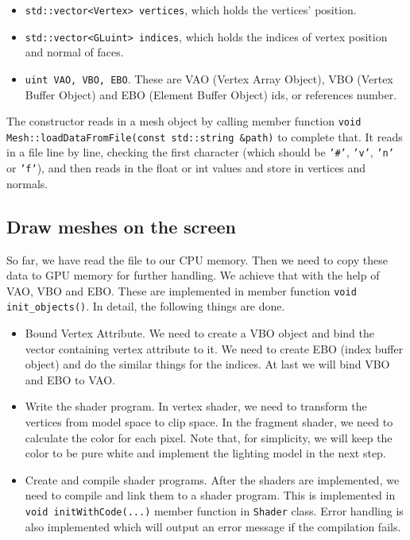 \documentclass[acmtog]{acmart}
\begin{document}
\begin{itemize}
	\item \texttt{std::vector<Vertex> vertices}, which holds the vertices' position.
 	\item \texttt{std::vector<GLuint> indices}, which holds the indices of vertex position and normal of faces.
  	\item \texttt{uint VAO, VBO, EBO}. These are VAO (Vertex Array Object), VBO (Vertex Buffer Object) and EBO (Element Buffer Object) ids, or references number.
\end{itemize}

The constructor reads in a mesh object by calling member function \texttt{void Mesh::loadDataFromFile(const std::string \&path)} to complete that. It reads in a file line by line, checking the first character (which should be \texttt{'\#'}, \texttt{'v'}, \texttt{'n'} or \texttt{'f'}), and then reads in the float or int values and store in vertices and normals.


\subsection{Draw meshes on the screen}

So far, we have read the file to our CPU memory. Then we need to copy these data to GPU memory for further handling. We achieve that with the help of VAO, VBO and EBO. These are implemented in member function \texttt{void init\_objects()}. In detail, the following things are done.

\begin{itemize}
	\item Bound Vertex Attribute. We need to create a VBO object and bind the vector containing vertex attribute to it. We need to create EBO (index buffer object) and do the similar things for the indices. At last we will bind VBO and EBO to VAO.
	\item Write the shader program. In vertex shader, we need to transform the vertices from model space to clip space. In the fragment shader, we need to calculate the color for each pixel. Note that, for simplicity, we will keep the color to be pure white and implement the lighting model in the next step.
	\item Create and compile shader programs. After the shaders are implemented, we need to compile and link them to a shader program. This is implemented in \verb|void initWithCode(...)| member function in \verb|Shader| class. Error handling is also implemented which will output an error message if the compilation fails.
\end{itemize}
\end{document}
